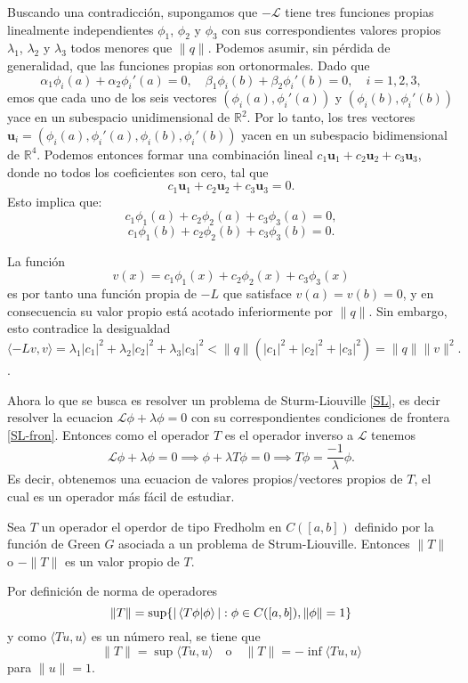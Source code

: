 \documentclass[main.tex]{subfiles}
\begin{document}
Buscando una contradicción, supongamos que $-\mathcal{L}$ tiene tres funciones propias linealmente independientes $\phi_1$, $\phi_2$ y $\phi_3$ con sus correspondientes valores propios $\lambda_1$, $\lambda_2$ y $\lambda_3$ todos menores que $\|q\|$. Podemos asumir, sin pérdida de generalidad, que las funciones propias son ortonormales. Dado que
\[
\alpha_1 \phi_i(a) + \alpha_2 \phi_i'(a) = 0, \quad \beta_1 \phi_i(b) + \beta_2 \phi_i'(b) = 0, \quad i = 1,2,3,
\]
emos que cada uno de los seis vectores $(\phi_i(a), \phi_i'(a))$ y $(\phi_i(b), \phi_i'(b))$ yace en un subespacio unidimensional de $\mathbb{R}^2$. Por lo tanto, los tres vectores $\mathbf{u}_i = (\phi_i(a), \phi_i'(a), \phi_i(b), \phi_i'(b))$ yacen en un subespacio bidimensional de $\mathbb{R}^4$. Podemos entonces formar una combinación lineal $c_1 \mathbf{u}_1 + c_2 \mathbf{u}_2 + c_3 \mathbf{u}_3$, donde no todos los coeficientes son cero, tal que
\[
c_1 \mathbf{u}_1 + c_2 \mathbf{u}_2 + c_3 \mathbf{u}_3 = 0.
\]
Esto implica que:
\[
c_1 \phi_1(a) + c_2 \phi_2(a) + c_3 \phi_3(a) = 0,
\]
\[
c_1 \phi_1(b) + c_2 \phi_2(b) + c_3 \phi_3(b) = 0.
\]

La función
\[
v(x) = c_1 \phi_1(x) + c_2 \phi_2(x) + c_3 \phi_3(x)
\]
es por tanto una función propia de $-L$ que satisface $v(a) = v(b) = 0$, y en consecuencia su valor propio está acotado inferiormente por $\|q\|$. Sin embargo, esto contradice la desigualdad
\[
\langle -L v, v \rangle = \lambda_1 |c_1|^2 + \lambda_2 |c_2|^2 + \lambda_3 |c_3|^2 < \|q\|(|c_1|^2 + |c_2|^2 + |c_3|^2) = \|q\| \|v\|^2.
\]
\QED.

Ahora lo que se busca es resolver un problema de Sturm-Liouville \ref{SL}, es decir resolver la ecuacion $\mathcal{L}\phi+\lambda\phi=0$ con su correspondientes condiciones de frontera \ref{SL-fron}. Entonces como el operador $T$ es el operador inverso a $\mathcal{L}$ tenemos
\[
\mathcal{L}\phi+\lambda\phi=0\implies\phi+\lambda T\phi=0\implies T\phi=\frac{-1}{\lambda}\phi.
\]
Es decir, obtenemos una ecuacion de valores propios/vectores propios de $T$, el cual es un operador más fácil de estudiar.

\begin{teorema}
 Sea $T$ un operador el operdor de tipo Fredholm en $C([a,b])$ definido por la función de Green $G$ asociada a un problema de Strum-Liouville. Entonces $\|T\|$ o $-\|T\|$ es un valor propio de $T$.
  \end{teorema}
\dem Por definición de norma de operadores
\[
\|T\| = \sup\{|\braket{T\phi | \phi}| : \phi \in C([a,b]), \|\phi\| = 1\}
\]
y como $\langle Tu,u\rangle$ es un número real, se tiene que
\[
\|T\| = \sup \langle Tu,u\rangle \quad \text{o} \quad \|T\| = -\inf \langle Tu,u\rangle
\]
para $\|u\| = 1$.
\end{document}
